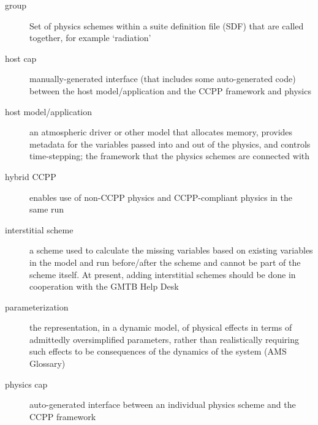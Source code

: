 \documentclass[letterpaper,10pt,english]{sphinxmanual}
\begin{document}
\begin{description}
\item[{group\label{\detokenize{Glossary:term-group}}}] \leavevmode
Set of physics schemes within a suite definition file (SDF) that are called together, for example ‘radiation’

\item[{host cap\label{\detokenize{Glossary:term-host-cap}}}] \leavevmode
manually-generated interface (that includes some auto-generated code) between the host
model/application and the CCPP framework and physics

\item[{host model/application\label{\detokenize{Glossary:term-host-model-application}}}] \leavevmode
an atmospheric driver or other model that allocates memory, provides metadata for the
variables passed into and out of the physics, and controls time-stepping; the framework
that the physics schemes are connected with

\item[{hybrid CCPP\label{\detokenize{Glossary:term-hybrid-ccpp}}}] \leavevmode
enables use of non-CCPP physics and CCPP-compliant physics in the same run

\item[{interstitial scheme\label{\detokenize{Glossary:term-interstitial-scheme}}}] \leavevmode
a scheme used to calculate the missing variables based on existing variables in the model
and run before/after the scheme and cannot be part of the scheme itself. At present,
adding interstitial schemes should be done in cooperation with the GMTB Help Desk

\item[{parameterization\label{\detokenize{Glossary:term-parameterization}}}] \leavevmode
the representation, in a dynamic model, of physical effects in terms of admittedly
oversimplified parameters, rather than realistically requiring such effects to be
consequences of the dynamics of the system (AMS Glossary)

\item[{physics cap\label{\detokenize{Glossary:term-physics-cap}}}] \leavevmode
auto-generated interface between an individual  physics scheme and the CCPP framework


\end{description}
\end{document}
